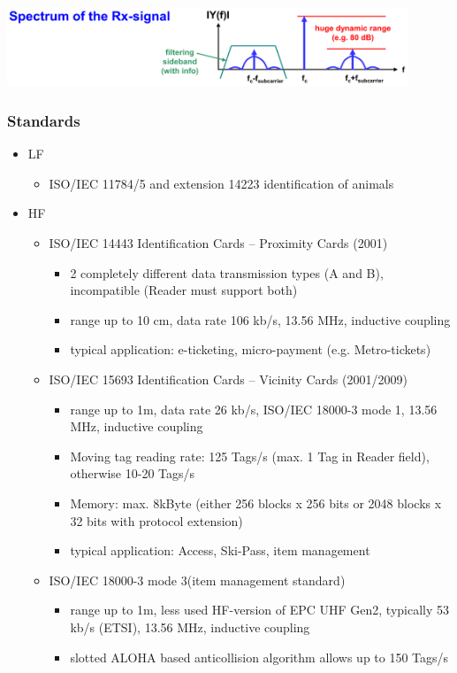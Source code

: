 	\begin{minipage}{12cm}
		\includegraphics[width=12cm]{./bilder/rfid-spectrum.png} 
	\end{minipage}
	
\subsubsection{Standards}
	\begin{itemize}
		\item LF
			\begin{itemize}
				\item ISO/IEC 11784/5 and extension 14223 identification of animals
			\end{itemize} 
		\item HF
			\begin{itemize}
				\item ISO/IEC 14443	Identification Cards – Proximity Cards (2001) 
					\begin{itemize}
						\item 2 completely different data transmission types (A and B), incompatible (Reader must support both)
						\item range up to 10 cm, data rate 106 kb/s, 13.56 MHz, inductive coupling
						\item typical application: e-ticketing, micro-payment (e.g. Metro-tickets)
					\end{itemize}
				\item ISO/IEC 15693	Identification Cards – Vicinity Cards (2001/2009)
					\begin{itemize}
						\item range up to 1m, data rate 26 kb/s, ISO/IEC 18000-3 mode 1, 13.56 MHz, inductive coupling
						\item Moving tag reading rate: 125 Tags/s (max. 1 Tag in Reader field), otherwise 10-20 Tags/s
						\item Memory: max. 8kByte (either 256 blocks x 256 bits or 2048 blocks x 32 bits with protocol extension)
						\item typical application: Access, Ski-Pass, item management
					\end{itemize}
				\item ISO/IEC 18000-3 mode 3(item management standard)
					\begin{itemize}
						\item range up to 1m, less used HF-version of EPC UHF Gen2, typically 53 kb/s (ETSI), 13.56 MHz, inductive coupling
						\item slotted ALOHA based anticollision algorithm allows up to 150 Tags/s
					\end{itemize}
						

\end{itemize}
\end{itemize}
